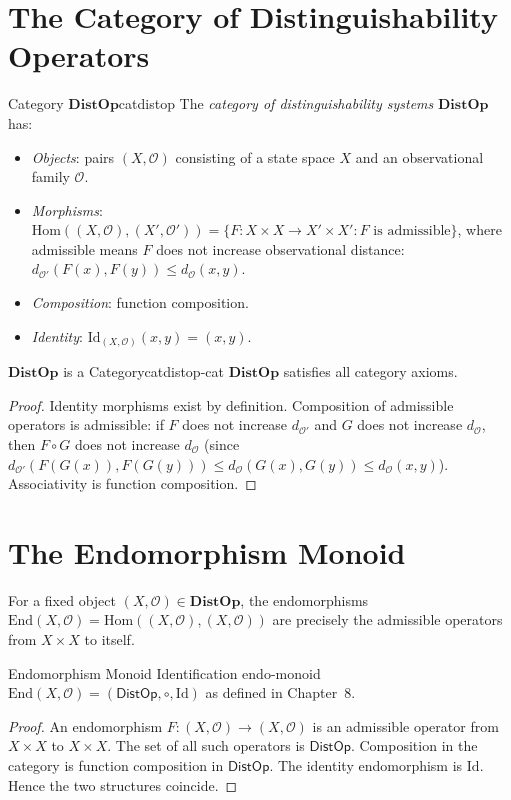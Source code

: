 \documentclass[12pt,twoside,openright]{book}
\newcommand{\obs}{\mathcal{O}}
\newcommand{\distOp}{\mathsf{DistOp}}
\providecommand{\catDistOp}{\mathbf{DistOp}}
\begin{document}
\section{The Category of Distinguishability Operators}

\begin{definition}{Category $\catDistOp$}{catdistop}
The \emph{category of distinguishability systems}
$\catDistOp$ has:
\begin{itemize}[nosep,leftmargin=2em]
  \item \emph{Objects}: pairs $(X,\obs)$ consisting of a
    state space $X$ and an observational family $\obs$.
  \item \emph{Morphisms}: $\mathrm{Hom}((X,\obs),(X',\obs'))
    = \{F:X\times X\to X'\times X' :
    F\text{ is admissible}\}$, where admissible means
    $F$ does not increase observational distance:
    $d_{\obs'}(F(x),F(y))\le d_\obs(x,y)$.
  \item \emph{Composition}: function composition.
  \item \emph{Identity}: $\mathrm{Id}_{(X,\obs)}(x,y)=(x,y)$.
\end{itemize}
\end{definition}

\begin{theorem}{$\catDistOp$ is a Category}{catdistop-cat}
$\catDistOp$ satisfies all category axioms.
\begin{proof}
Identity morphisms exist by definition.
Composition of admissible operators is admissible: if $F$
does not increase $d_{\obs'}$ and $G$ does not increase
$d_\obs$, then $F\circ G$ does not increase $d_\obs$
(since $d_{\obs'}(F(G(x)),F(G(y)))\le d_\obs(G(x),G(y))
\le d_\obs(x,y)$).
Associativity is function composition.
\end{proof}
\end{theorem}

\section{The Endomorphism Monoid}

For a fixed object $(X,\obs)\in\catDistOp$, the endomorphisms
$\mathrm{End}(X,\obs)=\mathrm{Hom}((X,\obs),(X,\obs))$ are
precisely the admissible operators from $X\times X$ to itself.

\begin{theorem}{Endomorphism Monoid Identification}%
  {endo-monoid}
$\mathrm{End}(X,\obs) = (\distOp,\circ,\mathrm{Id})$ as
defined in Chapter~8.
\begin{proof}
An endomorphism $F:(X,\obs)\to(X,\obs)$ is an admissible
operator from $X\times X$ to $X\times X$. The set of all
such operators is $\distOp$. Composition in the category
is function composition in $\distOp$. The identity endomorphism
is $\mathrm{Id}$. Hence the two structures coincide.
\end{proof}
\end{theorem}
\end{document}
